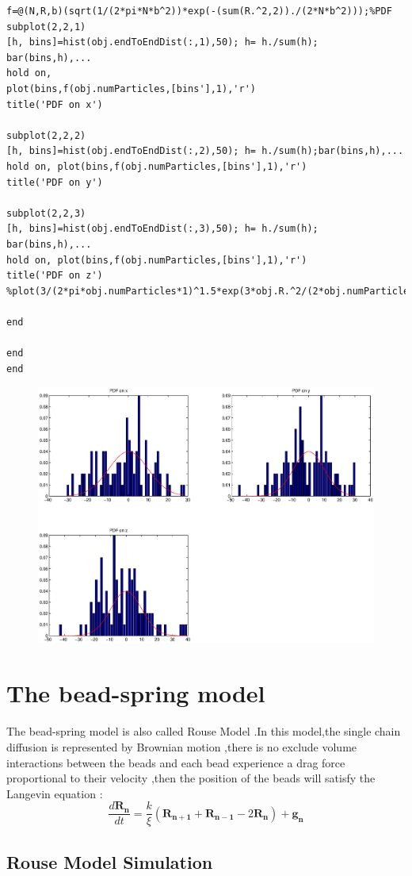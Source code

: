 \documentclass{article}
\begin{document}
\begin{lstlisting}
f=@(N,R,b)(sqrt(1/(2*pi*N*b^2))*exp(-(sum(R.^2,2))./(2*N*b^2)));%PDF 
subplot(2,2,1)
[h, bins]=hist(obj.endToEndDist(:,1),50); h= h./sum(h); bar(bins,h),...
hold on, 
plot(bins,f(obj.numParticles,[bins'],1),'r')
title('PDF on x')

subplot(2,2,2)
[h, bins]=hist(obj.endToEndDist(:,2),50); h= h./sum(h);bar(bins,h),...
hold on, plot(bins,f(obj.numParticles,[bins'],1),'r')
title('PDF on y')

subplot(2,2,3)
[h, bins]=hist(obj.endToEndDist(:,3),50); h= h./sum(h); bar(bins,h),...
hold on, plot(bins,f(obj.numParticles,[bins'],1),'r')
title('PDF on z')
%plot(3/(2*pi*obj.numParticles*1)^1.5*exp(3*obj.R.^2/(2*obj.numParticles*1)))

end

end
end 

\end{lstlisting}
\begin{figure}[H]
	\includegraphics[width=6.2in]{PDF.eps} 
	 
	 \end{figure}
	 \section{The bead-spring model}
	 \paragraph{}
	 The bead-spring model is also called Rouse Model .In this model,the single chain diffusion is represented by Brownian motion ,there is no exclude volume 	interactions between the beads and each bead experience a drag force proportional to their velocity ,then the position of the beads will satisfy the Langevin equation :
	 \begin{equation}
	 \frac{d\bm{R_n}}{dt}=\frac{k}{\xi}(\bm{R_{n+1}}+\bm{R_{n-1}}-2\bm{R_{n}})+\bm{g_n}
	 \end{equation}
	 \subsection{Rouse Model Simulation}
	 
\end{document}
